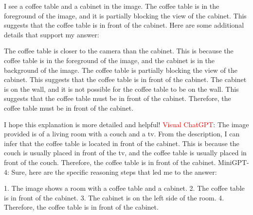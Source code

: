 \begin{enumerate}
    I see a coffee table and a cabinet in the image.
    The coffee table is in the foreground of the image, and it is partially blocking the view of the cabinet.
    This suggests that the coffee table is in front of the cabinet.
    Here are some additional details that support my answer:
    
    The coffee table is closer to the camera than the cabinet. This is because the coffee table is in the foreground of the image, and the cabinet is in the background of the image.
    The coffee table is partially blocking the view of the cabinet. This suggests that the coffee table is in front of the cabinet.
    The cabinet is on the wall, and it is not possible for the coffee table to be on the wall. This suggests that the coffee table must be in front of the cabinet.
    Therefore, the coffee table must be in front of the cabinet.
    
    I hope this explanation is more detailed and helpful! 
    \subitem \textcolor{red}{Visual ChatGPT}: The image provided is of a living room with a couch and a tv. From the description, I can infer that the coffee table is located in front of the cabinet. This is because the couch is usually placed in front of the tv, and the coffee table is usually placed in front of the couch. Therefore, the coffee table is in front of the cabinet.
    \subitem MiniGPT-4: Sure, here are the specific reasoning steps that led me to the answer:

    1. The image shows a room with a coffee table and a cabinet.
    2. The coffee table is in front of the cabinet.
    3. The cabinet is on the left side of the room.
    4. Therefore, the coffee table is in front of the cabinet.
\end{enumerate}
